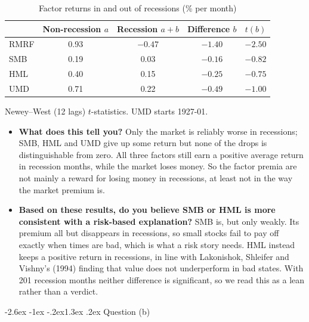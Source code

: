 \documentclass[11pt]{article}
\makeatletter
\renewcommand\section{\@startsection{section}{1}{0pt}%
  {-2.6ex \@plus -1ex \@minus -.2ex}{1.3ex \@plus .2ex}%
  {\normalfont\scshape\large\color{psink}}}   %
\newenvironment{tight}
  {\begin{itemize}\setlength{\itemsep}{3pt}\setlength{\parskip}{0pt}%
   \setlength{\topsep}{3pt}\setlength{\leftmargini}{1.4em}}
  {\end{itemize}}
\makeatother
\begin{document}
\begin{table}[H]\centering\small
\caption{Factor returns in and out of recessions (\% per month)}
\begin{tabular}{lcccc}
\toprule
 & Non-recession $a$ & Recession $a+b$ & Difference $b$ & $t(b)$ \\
\midrule
RMRF & 0.93 & $-0.47$ & $-1.40$ & $-2.50$ \\
SMB  & 0.19 & 0.03    & $-0.16$ & $-0.82$ \\
HML  & 0.40 & 0.15    & $-0.25$ & $-0.75$ \\
UMD  & 0.71 & 0.22    & $-0.49$ & $-1.00$ \\
\bottomrule
\end{tabular}
\par\smallskip\footnotesize Newey--West (12 lags) $t$-statistics. UMD starts 1927-01.
\end{table}

\begin{tight}
  \item \textbf{What does this tell you?} Only the market is reliably worse in
  recessions; SMB, HML and UMD give up some return but none of the drops is
  distinguishable from zero. All three factors still earn a positive average return in
  recession months, while the market loses money. So the factor premia are not
  mainly a reward for losing money in recessions, at least not in the way the market premium is.
  \item \textbf{Based on these results, do you believe SMB or HML is more consistent
  with a risk-based explanation?} SMB is, but only weakly. Its premium all but
  disappears in recessions, so small stocks fail to pay off exactly when times are
  bad, which is what a risk story needs. HML instead keeps a positive return in
  recessions, in line with Lakonishok, Shleifer and Vishny's (1994) finding that value does not
  underperform in bad states. With 201 recession months neither difference is
  significant, so we read this as a lean rather than a verdict.
\end{tight}

\section{Question (b)}
\end{document}
